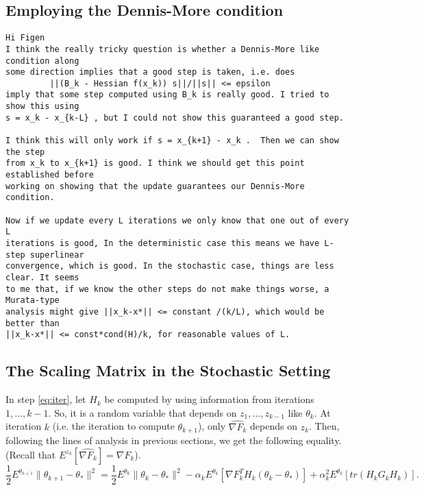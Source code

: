\documentclass[12pt]{article}
\begin{document}
\bigskip

\subsection{Employing the Dennis-More condition}

\begin{verbatim}
Hi Figen
I think the really tricky question is whether a Dennis-More like condition along 
some direction implies that a good step is taken, i.e. does 
         ||(B_k - Hessian f(x_k)) s||/||s|| <= epsilon 
imply that some step computed using B_k is really good. I tried to show this using 
s = x_k - x_{k-L} , but I could not show this guaranteed a good step.

I think this will only work if s = x_{k+1} - x_k .  Then we can show the step 
from x_k to x_{k+1} is good. I think we should get this point established before 
working on showing that the update guarantees our Dennis-More condition.

Now if we update every L iterations we only know that one out of every L 
iterations is good, In the deterministic case this means we have L-step superlinear 
convergence, which is good. In the stochastic case, things are less clear. It seems 
to me that, if we know the other steps do not make things worse, a Murata-type 
analysis might give ||x_k-x*|| <= constant /(k/L), which would be better than 
||x_k-x*|| <= const*cond(H)/k, for reasonable values of L.
\end{verbatim}

\bigskip

\subsection{The Scaling Matrix in the Stochastic Setting}

In step \ref{eq:iter}, let $H_k$ be computed by using information from iterations $1,\dots,k-1$.  So, it is a random variable that depends on $z_1,\dots,z_{k-1}$ like $\theta_k$.  At iteration $k$ (i.e. the iteration to compute $\theta_{k+1}$), only $\hat{\nabla F_k}$ depends on $z_k$. Then, following the lines of analysis in previous sections, we get the following equality.  (Recall that $E^{z_k}[\hat{\nabla F_k}]=\nabla F_k$).
\[
 \frac{1}{2}E^{\theta_{k+1}}\|\theta_{k+1}-\theta_\ast\|^2 = \frac{1}{2}E^{\theta_k}\|\theta_k-\theta_\ast\|^2 -\alpha_kE^{\theta_k}[\nabla F_k^TH_k(\theta_k-\theta_\ast)] + \alpha_k^2 E^{\theta_k}[tr(H_kG_kH_k)].
\]

\bigskip
\end{document}
